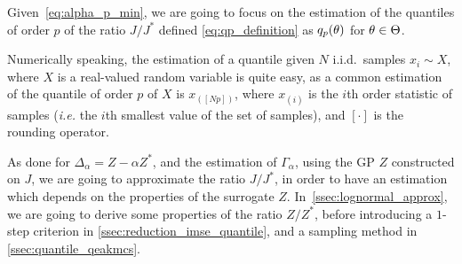 \documentclass[../../Main_ManuscritThese.tex]{subfiles}
\newcommand\imgpath{/home/victor/acadwriting/Manuscrit/Text/Chapter4/img/}
\begin{document}
\begin{figure}[ht]
  \centering
  
  \caption{\label{fig:q_p_illu}}
\end{figure}

Given~\cref{eq:alpha_p_min}, we are going to focus on the estimation
of the quantiles of order $p$ of the ratio $J/J^*$
defined \cref{eq:qp_definition} as $q_p(\theta)$ for $\theta \in \Theta$.

Numerically speaking, the estimation of a quantile given $N$ i.i.d.\
samples $x_i \sim X$, where $X$ is a real-valued random variable is
quite easy, as a common estimation of the quantile of order $p$ of $X$ is
$x_{(\left[Np\right])}$, where $x_{(i)}$ is the $i$th order statistic
of samples (\emph{i.e.} the $i$th smallest value of the set of
samples), and $[\cdot]$ is the rounding operator.

As done for $\Delta_{\alpha} = Z - \alpha Z^*$, and the estimation of
$\Gamma_{\alpha}$, using the GP $Z$ constructed on $J$, we are going
to approximate the ratio $J/J^*$, in order to have an estimation which
depends on the properties of the surrogate $Z$.
In~\cref{ssec:lognormal_approx}, we are going to derive some
properties of the ratio $Z/Z^*$, before introducing a $1$-step criterion in \cref{ssec:reduction_imse_quantile}, and a sampling method in \cref{ssec:quantile_qeakmcs}.
\end{document}
